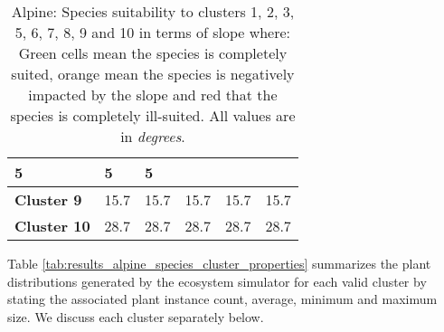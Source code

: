 \begin{table}[h]
\begin{tabular}{|p{2cm}|p{2.5cm}|p{2.5cm}|p{2.5cm}|p{2.5cm}|p{2.5cm}|}
		\cellcolor{color_green}5 & 
		\cellcolor{color_green}5 & 
		\cellcolor{color_green}5\\
		\hline
		\textbf{Cluster 9} & 
		\cellcolor{color_green}15.7 & 
		\cellcolor{color_orange}15.7 & 
		\cellcolor{color_green}15.7 & 
		\cellcolor{color_green}15.7 & 
		\cellcolor{color_orange}15.7\\
		\hline
		\textbf{Cluster 10} & 
		\cellcolor{color_orange}28.7 & 
		\cellcolor{color_orange}28.7 & 
		\cellcolor{color_green}28.7 & 
		\cellcolor{color_green}28.7 & 
		\cellcolor{color_orange}28.7\\
		\hline
		\end{tabular}
		\caption{Alpine: Species suitability to clusters 1, 2, 3, 5, 6, 7, 8, 9 and 10 in terms of slope where: Green cells mean the species is completely suited, orange mean the species is negatively impacted by the slope and red that the species is completely ill-suited. All values are in \textit{degrees}.}
	  \label{tab:results_alpine_species_slope_suitability}
\end{table}

Table \ref{tab:results_alpine_species_cluster_properties} summarizes the plant distributions generated by the ecosystem simulator for each valid cluster by stating the associated plant instance count, average, minimum and maximum size. We discuss each cluster separately below. \\

